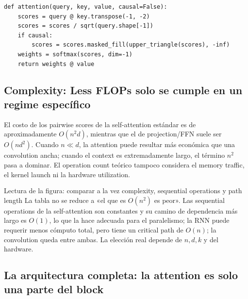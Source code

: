 \begin{lstlisting}[caption={Implementación conceptual de la scaled dot-product attention y la causal mask}]
def attention(query, key, value, causal=False):
    scores = query @ key.transpose(-1, -2)
    scores = scores / sqrt(query.shape[-1])
    if causal:
        scores = scores.masked_fill(upper_triangle(scores), -inf)
    weights = softmax(scores, dim=-1)
    return weights @ value
\end{lstlisting}

\subsection{Complexity: Less FLOPs solo se cumple en un regime específico}

El costo de los pairwise scores de la self-attention estándar es de aproximadamente $O(n^2d)$, mientras que el de projection/FFN suele ser $O(nd^2)$. Cuando $n\ll d$, la attention puede resultar más económica que una convolution ancha; cuando el context es extremadamente largo, el término $n^2$ pasa a dominar. El operation count teórico tampoco considera el memory traffic, el kernel launch ni la hardware utilization.


\begin{knowledgebox}{Lectura de la figura: comparar a la vez complexity, sequential operations y path length}
La tabla no se reduce a «el que es $O(n^2)$ es peor». Las sequential operations de la self-attention son constantes y su camino de dependencia más largo es $O(1)$, lo que la hace adecuada para el paralelismo; la RNN puede requerir menos cómputo total, pero tiene un critical path de $O(n)$; la convolution queda entre ambas. La elección real depende de $n,d,k$ y del hardware.
\end{knowledgebox}


\subsection{La arquitectura completa: la attention es solo una parte del block}

